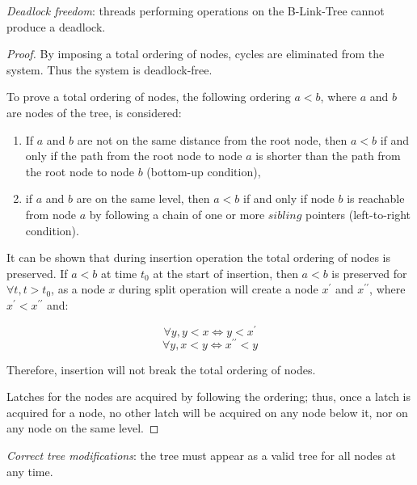 \begin{theorem}
  \textit{Deadlock freedom}: threads performing operations on the B-Link-Tree cannot produce a deadlock.
\end{theorem}

\begin{proof}
  By imposing a total ordering of nodes, cycles are eliminated from the system. Thus the system is deadlock-free.

  To prove a total ordering of nodes, the following ordering $a < b$, where $a$ and $b$ are nodes of the tree, is considered:

  \begin{enumerate}
    \item If $a$ and $b$ are not on the same distance from the root node, then $a < b$ if and only if the path from the root node to node $a$ is shorter than the path from the root node to node $b$ (bottom-up condition),
    \item if $a$ and $b$ are on the same level, then $a < b$ if and only if node $b$ is reachable from node $a$ by following a chain of one or more $sibling$ pointers (left-to-right condition).
  \end{enumerate}

  It can be shown that during insertion operation the total ordering of nodes is preserved. If $a < b$ at time $t_0$ at the start of insertion, then $a < b$ is preserved for $\forall t, t > t_0$, as a node $x$ during split operation will create a node $x^\prime$ and $x^{\prime\prime}$, where $x^\prime < x^{\prime\prime}$ and:

  $$\forall y, y < x \Leftrightarrow y < x^\prime$$
  $$\forall y, x < y \Leftrightarrow x^{\prime\prime} < y$$

  Therefore, insertion will not break the total ordering of nodes.

  Latches for the nodes are acquired by following the ordering; thus, once a latch is acquired for a node, no other latch will be acquired on any node below it, nor on any node on the same level.
\end{proof}

\begin{theorem}\label{theorem:b-link-tree:modifications}
  \textit{Correct tree modifications}: the tree must appear as a valid tree for all nodes at any time.
\end{theorem}


